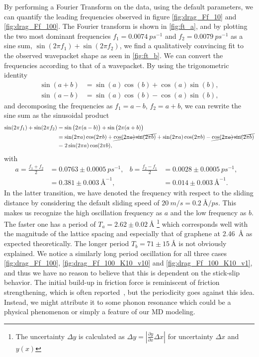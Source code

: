 By performing a Fourier Transform on the data, using the default parameters, we can quantify the leading frequencies observed in figure \cref{fig:drag_Ff_10} and \cref{fig:drag_Ff_100}. The Fourier transform is shown in \cref{fig:ft_a}, and by plotting the two most dominant frequencies $f_1 = \SI{0.0074}{ps^{-1}}$ and $f_2 = \SI{0.0079}{ps^{-1}}$ as a sine sum, $\sin{(2\pi f_1)} + \sin{(2\pi f_2)}$, we find a qualitatively convincing fit to the observed wavepacket shape as seen in \cref{fig:ft_b}. We can convert the frequencies according to that of a wavepacket. By using the trigonometric identity
\begin{align*}
\sin (a+b) &= \sin (a) \cos (b) + \cos (a) \sin (b), \\
\sin (a-b) &= \sin (a) \cos (b) - \cos (a) \sin (b),
\end{align*}
and decomposing the frequencies as $f_1 = a - b$, $f_2 = a + b$, we can rewrite the sine sum as the sinusoidal product
\begin{align*}
  \sin(2\pi f_1) + \sin(2\pi f_2) &= \sin\big(2\pi (a - b)\big) + \sin\big(2\pi (a + b)\big) \\
  &= \sin(2\pi a)\cos(2\pi b) + \cancel{\cos(2\pi a)\sin(2\pi b)} + \sin(2\pi a)\cos(2\pi b) - \cancel{\cos(2\pi a)\sin(2\pi b)} \\
  &= 2 \sin(2\pi a) \cos(2\pi b),
\end{align*} 
with 
\begin{align*}
  a = \frac{f_1 + f_2}{2} &= 0.0763 \pm \SI{0.0005}{ps^{-1}},& 
  b = \frac{f_2 - f_1}{2} &= 0.0028 \pm \SI{0.0005}{ps^{-1}},& \\
  &= 0.381 \pm \SI{0.003}{{\text{Å}}^{-1}},& 
  &= 0.014 \pm \SI{0.003}{{\text{Å}}^{-1}}.& 
\end{align*}
In the latter transition, we have denoted the frequency with respect to the sliding distance by considering the default sliding speed of $\SI{20}{m/s} = \SI{0.2}{\text{Å}/ps}$. This makes us recognize the high oscillation frequency as $a$ and the low frequency
as $b$. The faster one has a period of $T_a = 2.62 \pm \SI{0.02}{\text{Å}}$ \footnote{The
uncertainty $\Delta y$ is calculated as $\Delta y = \left|\frac{\partial
y}{\partial x} \Delta x \right|$ for uncertainty $\Delta x$ and $y(x)$} which
corresponds well with the magnitude of the lattice spacing and especially that of
graphene at \SI{2.46}{Å} as expected theoretically. The longer period $T_b = 71 \pm
\SI{15}{\text{Å}}$ is not obviously explained. We notice a similarly long period oscillation for all three cases \cref{fig:drag_Ff_100}, \cref{fig:drag_Ff_100_K10_v10} and \cref{fig:drag_Ff_100_K10_v1}, and thus we have no reason to believe that this is dependent on the stick-slip behavior. The initial build-up in friction force is reminiscent of friction strengthening, which is often reported~\cite{zhang_tuning_2019, li_evolving_2016}, but the periodicity goes against this idea. Instead, we might attribute it to some phonon
resonance which could be a physical phenomenon or simply a feature of our
\acrshort{MD} modeling. 

